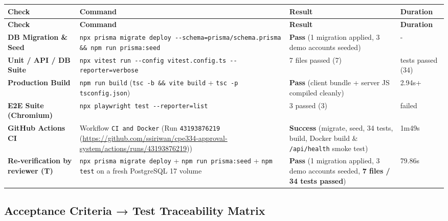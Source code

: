 \documentclass[11pt,a4paper]{article}
\begin{document}
\vspace{0.3em}
\begin{longtable}{|>{\RaggedRight}p{3.2cm}|>{\RaggedRight}p{6.0cm}|>{\RaggedRight}p{3.5cm}|>{\centering\arraybackslash}p{2.0cm}|}
\hline
\rowcolor{zenPale}\textbf{Check} & \textbf{Command} & \textbf{Result} & \textbf{Duration} \\ \hline
\endfirsthead
\hline
\rowcolor{zenPale}\textbf{Check} & \textbf{Command} & \textbf{Result} & \textbf{Duration} \\ \hline
\endhead
\hline
\endfoot
\textbf{DB Migration \& Seed} & \texttt{npx prisma migrate deploy -\allowbreak -\allowbreak schema=prisma/\allowbreak schema.\allowbreak prisma \&\& npm run prisma:\allowbreak seed} & \textbf{Pass} (1 migration applied, 3 demo accounts seeded) & - \\ \hline
\textbf{Unit / API / DB Suite} & \texttt{npx vitest run -\allowbreak -\allowbreak config vitest.\allowbreak config.\allowbreak ts -\allowbreak -\allowbreak reporter=verbose} & \textit{}7 files passed (7) \ & 34 tests passed (34) \ \\ \hline
\textbf{Production Build} & \texttt{npm run build} (\texttt{tsc -\allowbreak b \&\& vite build} + \texttt{tsc -\allowbreak p tsconfig.\allowbreak json}) & \textbf{Pass} (client bundle + server JS compiled cleanly) & 2.94s+ \\ \hline
\textbf{E2E Suite (Chromium)} & \texttt{npx playwright test -\allowbreak -\allowbreak reporter=list} & \textit{}3 passed (3) \ & 0 failed \ \\ \hline
\textbf{GitHub Actions CI} & Workflow \texttt{CI and Docker} (Run \texttt{43193876219} (\url{https://github.com/ssiriwan/cpe334-approval-system/actions/runs/43193876219})) & \textbf{Success} (migrate, seed, 34 tests, build, Docker build \& \texttt{/\allowbreak api/\allowbreak health} smoke test) & 1m49s \\ \hline
\textbf{Re-verification by reviewer (T)} & \texttt{npx prisma migrate deploy} + \texttt{npm run prisma:\allowbreak seed} + \texttt{npm test} on a fresh PostgreSQL 17 volume & \textbf{Pass} (1 migration applied, 3 demo accounts seeded, \textbf{7 files / 34 tests passed}) & 79.86s \\ \hline
\end{longtable}
\vspace{0.3em}


\subsection{Acceptance Criteria → Test Traceability Matrix}
\end{document}
